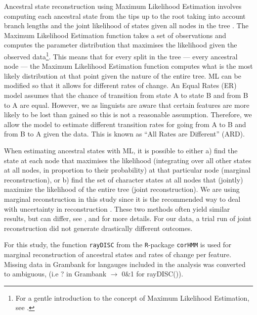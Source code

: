 \documentclass[draft,10pt]{article} %
\begin{document}
Ancestral state reconstruction using Maximum Likelihood Estimation involves computing each ancestral state from the tips up to the root taking into account branch lengths and the joint likelihood of states given all nodes in the tree \citep{wilks1938large, fisher1912absolute, pagel1994detecting, cunningham1998reconstructing}. The Maximum Likelihood Estimation function takes a set of observations and computes the parameter distribution that maximises the likelihood given the observed data\footnote{For a gentle introduction to the concept of Maximum Likelihood Estimation, see \citet{jonny_ML}.}. This means that for every split in the tree --- every ancestral node --- the Maximum Likelihood Estimation function computes what is the most likely distribution at that point given the nature of the entire tree. ML can be modified so that it allows for different rates of change. An Equal Rates (ER) model assumes that the chance of transition from state A to state B and from B to A are equal. However, we as linguists are aware that certain features are more likely to be lost than gained so this is not a reasonable assumption. Therefore, we allow the model to estimate different transition rates for going from A to B and from B to A given the data. This is known as ``All Rates are Different'' (ARD).

When estimating ancestral states with ML, it is possible to either a) find the state at each node that maximises the likelihood (integrating over all other states at all nodes, in proportion to their probability) at that particular node (marginal reconstruction), or b) find the set of character states at all nodes that (jointly) maximize the likelihood of the entire tree (joint reconstruction). We are using marginal reconstruction in this study since it is the recommended way to deal with uncertainty in reconstruction \citep{revell_2014}. These two methods often yield similar results, but can differ, see \citet[259-260]{felsenstein2004inferring},  \citet[121-126]{yang2006computational} and \citet[5]{joy2016ancestral} for more details. For our data, a trial run of joint reconstruction did not generate drastically different outcomes.

For this study, the function \texttt{rayDISC} from the \texttt{R}-package \texttt{corHMM} \citep{corHMM} is used for marginal reconstruction of ancestral states and rates of change per feature. Missing data in Grambank for langauges included in the analysis was converted to ambiguous, (i.e ? in Grambank $\rightarrow$ 0\&1 for rayDISC()). 
\end{document}

